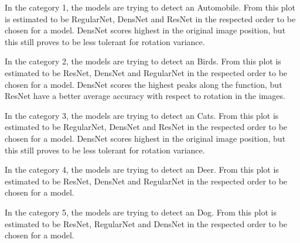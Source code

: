 \FloatBarrier

In the category 1, the models are trying to detect an Automobile. From this plot is estimated to be RegularNet, DensNet and ResNet in the respected order to be chosen for a model. DensNet scores highest in the original image position, but this still proves to be less tolerant for rotation variance. 

\FloatBarrier 

In the category 2, the models are trying to detect an Birds. From this plot is estimated to be ResNet, DensNet and RegularNet in the respected order to be chosen for a model. DensNet scores the highest peaks along the function, but ResNet have a better average accuracy with respect to rotation in the images. 

\FloatBarrier 

In the category 3, the models are trying to detect an Cats. From this plot is estimated to be RegularNet, DensNet and ResNet in the respected order to be chosen for a model. DensNet scores highest in the original image position, but this still proves to be less tolerant for rotation variance. 

\FloatBarrier 

In the category 4, the models are trying to detect an Deer. From this plot is estimated to be ResNet, DensNet and RegularNet in the respected order to be chosen for a model. 

\FloatBarrier 

In the category 5, the models are trying to detect an Dog. From this plot is estimated to be ResNet, RegularNet and DensNet in the respected order to be chosen for a model.

\FloatBarrier 

